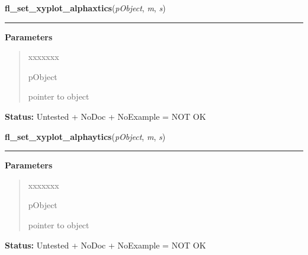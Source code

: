 \hspace{.8\funcindent}\begin{boxedminipage}{\funcwidth}

    \raggedright \textbf{fl\_set\_xyplot\_alphaxtics}(\textit{pObject}, \textit{m}, \textit{s})

    \vspace{-1.5ex}

    \rule{\textwidth}{0.5\fboxrule}
\setlength{\parskip}{2ex}
\setlength{\parskip}{1ex}
      \textbf{Parameters}
      \vspace{-1ex}

      \begin{quote}
        \begin{Ventry}{xxxxxxx}

          \item[pObject]

          pointer to object

        \end{Ventry}

      \end{quote}

\textbf{Status:} Untested + NoDoc + NoExample = NOT OK



    \end{boxedminipage}

    \label{xformslib:library:fl_set_xyplot_alphaytics}

    \vspace{0.5ex}

\hspace{.8\funcindent}\begin{boxedminipage}{\funcwidth}

    \raggedright \textbf{fl\_set\_xyplot\_alphaytics}(\textit{pObject}, \textit{m}, \textit{s})

    \vspace{-1.5ex}

    \rule{\textwidth}{0.5\fboxrule}
\setlength{\parskip}{2ex}
\setlength{\parskip}{1ex}
      \textbf{Parameters}
      \vspace{-1ex}

      \begin{quote}
        \begin{Ventry}{xxxxxxx}

          \item[pObject]

          pointer to object

        \end{Ventry}

      \end{quote}

\textbf{Status:} Untested + NoDoc + NoExample = NOT OK



    \end{boxedminipage}

